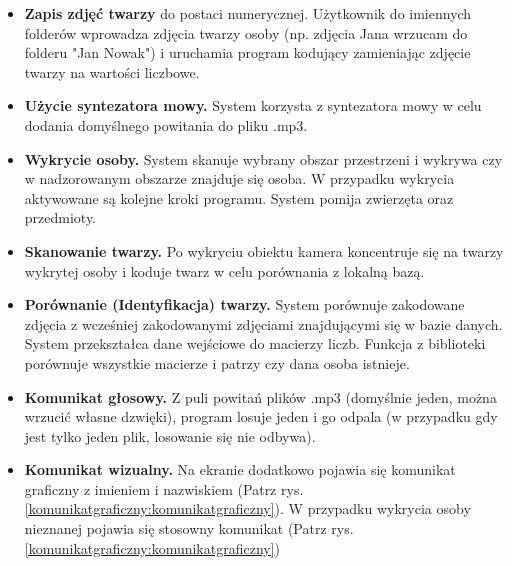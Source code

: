 \documentclass[a4paper,12pt,reqno]{article}
\begin{document}
\begin{itemize}
	\item \textbf{Zapis zdjęć twarzy} do postaci numerycznej. Użytkownik do imiennych folderów wprowadza zdjęcia twarzy osoby (np. zdjęcia Jana wrzucam do folderu "Jan Nowak") i uruchamia program kodujący zamieniając zdjęcie twarzy na wartości liczbowe.
	\item \textbf{Użycie syntezatora mowy.} System korzysta z syntezatora mowy w celu dodania domyślnego powitania do pliku .mp3.
	\item \textbf{Wykrycie osoby.} System skanuje wybrany obszar przestrzeni i wykrywa czy w nadzorowanym obszarze znajduje się osoba. W przypadku wykrycia aktywowane są kolejne kroki programu. System pomija zwierzęta oraz przedmioty.
	\item \textbf{Skanowanie  twarzy.} Po wykryciu obiektu kamera koncentruje się na twarzy wykrytej osoby i koduje twarz w celu porównania z lokalną bazą.
	\item \textbf{Porównanie (Identyfikacja) twarzy.} System porównuje zakodowane zdjęcia z wcześniej zakodowanymi zdjęciami znajdującymi się w bazie danych. System przekształca dane wejściowe do macierzy liczb. Funkcja z biblioteki porównuje wszystkie macierze i patrzy czy dana osoba istnieje.
	\item \textbf{Komunikat głosowy.} Z puli powitań plików .mp3 (domyślnie jeden, można wrzucić własne dzwięki), program losuje jeden i go odpala (w przypadku gdy jest tylko jeden plik, losowanie się nie odbywa).
	\item \textbf{Komunikat wizualny.} Na ekranie dodatkowo pojawia się komunikat graficzny z imieniem i nazwiskiem (Patrz rys. \ref{komunikatgraficzny:komunikatgraficzny}). W przypadku wykrycia osoby nieznanej pojawia się stosowny komunikat (Patrz rys. \ref{komunikatgraficzny:komunikatgraficzny})
\end{itemize}
\end{document}
